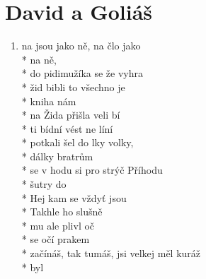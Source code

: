 \section{David a Goliáš}
\begin{enumerate}
\item[]  na  jsou jako ně,  na člo jako  \\*
  na ně,    \\*
 do pidimužíka   se že vyhra \\*
   žid  bibli  to všechno je \\*
 kniha nám  \\*
 na Žida přišla veli bí \\*
 ti bídní   vést ne líní \\*
 potkali    šel do lky volky,  \\*
 dálky  bratrům  \\*
 se  v hodu  si pro strýč Příhodu \\*
 šutry do   \\*
Hej  kam se  vždyť jsou  \\*
Takhle  ho   slušně  \\*
 mu ale  plivl  oč \\*
 se očí prakem  \\*
 začínáš,  tak tumáš,  jsi velkej  měl kuráž \\*
 byl  
\end{enumerate}